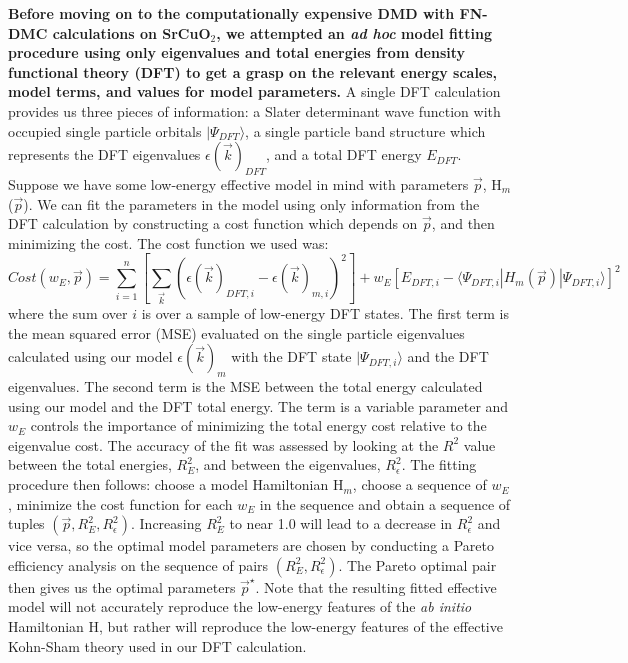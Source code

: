 \documentclass{article}
\begin{document}
\textbf{Before moving on to the computationally expensive DMD with FN-DMC calculations on SrCuO$_2$, we attempted an \textit{ad hoc} model fitting procedure using only eigenvalues and total energies from density functional theory (DFT) to get a grasp on the relevant energy scales, model terms, and values for model parameters. }
A single DFT calculation provides us three pieces of information: a Slater determinant wave function with occupied single particle orbitals $|\Psi_{DFT}\rangle$, a single particle band structure which represents the DFT eigenvalues $\epsilon(\vec{k})_{DFT}$, and a total DFT energy $E_{DFT}$. 
Suppose we have some low-energy effective model in mind with parameters $\vec{p}$, H$_m$($\vec{p}$).
We can fit the parameters in the model using only information from the DFT calculation by constructing a cost function which depends on $\vec{p}$, and then minimizing the cost. 
The cost function we used was:
\begin{equation}
Cost(w_E, \vec{p}) = \sum_{i=1}^{n} [\sum_{\vec{k}}(\epsilon(\vec{k})_{DFT,i} - \epsilon(\vec{k})_{m,i})^2] + w_E[E_{DFT,i} - \langle \Psi_{DFT,i}|H_m(\vec{p})| \Psi_{DFT,i} \rangle]^2
\end{equation}
where the sum over $i$ is over a sample of low-energy DFT states. 
The first term is the mean squared error (MSE) evaluated on the single particle eigenvalues calculated using our model $\epsilon(\vec{k})_m$ with the DFT state $|\Psi_{DFT,i}\rangle$ and the DFT eigenvalues. 
The second term is the MSE between the total energy calculated using our model and the DFT total energy. 
The term is a variable parameter and $w_E$ controls the importance of minimizing the total energy cost relative to the eigenvalue cost.
The accuracy of the fit was assessed by looking at the $R^2$ value between the total energies, $R^2_E$, and between the eigenvalues, $R^2_\epsilon$. 
The fitting procedure then follows: choose a model Hamiltonian H$_m$, choose a sequence of $w_E$, minimize the cost function for each $w_E$ in the sequence and obtain a sequence of tuples $(\vec{p}, R^2_E, R^2_\epsilon)$. 
Increasing $R^2_E$ to near 1.0 will lead to a decrease in $R^2_\epsilon$ and vice versa, so the optimal model parameters are chosen by conducting a Pareto efficiency analysis on the sequence of pairs $(R^2_E, R^2_\epsilon)$. 
The Pareto optimal pair then gives us the optimal parameters $\vec{p}^\star$. 
Note that the resulting fitted effective model will not accurately reproduce the low-energy features of the \textit{ab initio} Hamiltonian H, but rather will reproduce the low-energy features of the effective Kohn-Sham theory used in our DFT calculation.
\end{document}

